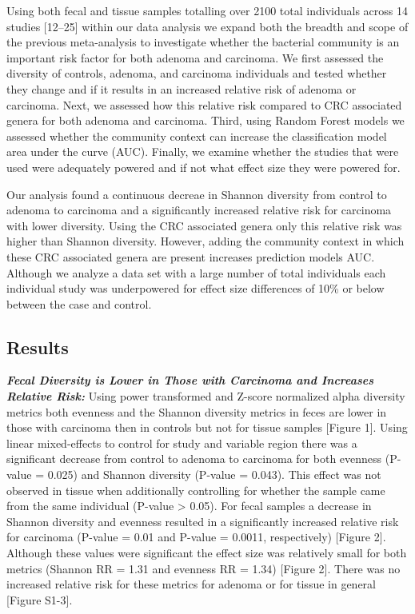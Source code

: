 \documentclass[12pt,]{article}
\begin{document}
Using both fecal and tissue samples totalling over 2100 total
individuals across 14 studies {[}12--25{]} within our data analysis we
expand both the breadth and scope of the previous meta-analysis to
investigate whether the bacterial community is an important risk factor
for both adenoma and carcinoma. We first assessed the diversity of
controls, adenoma, and carcinoma individuals and tested whether they
change and if it results in an increased relative risk of adenoma or
carcinoma. Next, we assessed how this relative risk compared to CRC
associated genera for both adenoma and carcinoma. Third, using Random
Forest models we assessed whether the community context can increase the
classification model area under the curve (AUC). Finally, we examine
whether the studies that were used were adequately powered and if not
what effect size they were powered for.

Our analysis found a continuous decreae in Shannon diversity from
control to adenoma to carcinoma and a significantly increased relative
risk for carcinoma with lower diversity. Using the CRC associated genera
only this relative risk was higher than Shannon diversity. However,
adding the community context in which these CRC associated genera are
present increases prediction models AUC. Although we analyze a data set
with a large number of total individuals each individual study was
underpowered for effect size differences of 10\% or below between the
case and control.

\newpage

\subsection{Results}\label{results}

\textbf{\emph{Fecal Diversity is Lower in Those with Carcinoma and
Increases Relative Risk:}} Using power transformed and Z-score
normalized alpha diversity metrics both evenness and the Shannon
diversity metrics in feces are lower in those with carcinoma then in
controls but not for tissue samples {[}Figure 1{]}. Using linear
mixed-effects to control for study and variable region there was a
significant decrease from control to adenoma to carcinoma for both
evenness (P-value = 0.025) and Shannon diversity (P-value = 0.043). This
effect was not observed in tissue when additionally controlling for
whether the sample came from the same individual (P-value \textgreater{}
0.05). For fecal samples a decrease in Shannon diversity and evenness
resulted in a significantly increased relative risk for carcinoma
(P-value = 0.01 and P-value = 0.0011, respectively) {[}Figure 2{]}.
Although these values were significant the effect size was relatively
small for both metrics (Shannon RR = 1.31 and evenness RR = 1.34)
{[}Figure 2{]}. There was no increased relative risk for these metrics
for adenoma or for tissue in general {[}Figure S1-3{]}.
\end{document}
